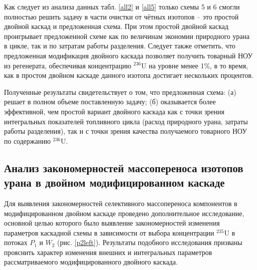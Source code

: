 \newpage

Как следует из анализа данных табл. \ref{all2} и \ref{all5} только схемы 5 и 6 смогли полностью решить задачу в части очистки от чётных изотопов -- это простой двойной каскад и предложенная схема. При этом простой двойной каскад проигрывает предложенной схеме как по величинам экономии природного урана в цикле, так и по затратам работы разделения. Следует также отметить, что предложенная модификация двойного каскада позволяет получить товарный НОУ из регенерата, обеспечивая концентрацию $^{236}$U на уровне менее 1\%, в то время, как в простом двойном каскаде данного изотопа достигает нескольких процентов. 

Полученные результаты свидетельствует о том, что предложенная схема: (а) решает в полном объеме поставленную задачу; (б) оказывается более эффективной, чем простой вариант двойного каскада как с точки зрения интегральных показателей топливного цикла (расход природного урана, затраты работы разделения), так и с точки зрения качества получаемого товарного НОУ по содержанию $^{236}$U.

\subsection{Анализ закономерностей массопереноса изотопов урана в двойном модифицированном каскаде}

Для выявления закономерностей селективного массопереноса компонентов в модифицированном двойном каскаде  проведено дополнительное исследование, основной целью которого было выявление закономерностей изменения параметров каскадной схемы в зависимости от выбора концентрации $^{235}$U в потоках $P_1$ и $W_2$ (рис. \ref{p2left}). Результаты подобного исследования призваны прояснить характер изменения внешних и интегральных параметров рассматриваемого модифицированного двойного каскада.

